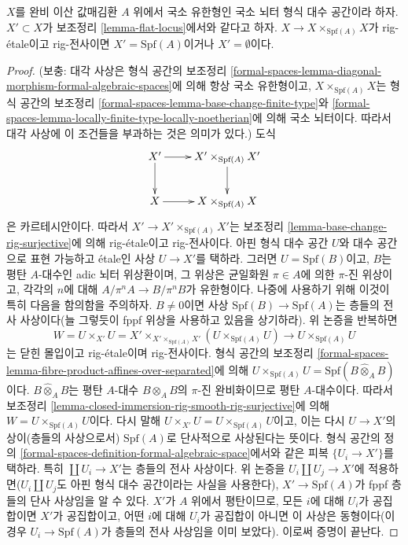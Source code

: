 \begin{lemma}
\label{lemma-flat-and-diagonal-rig-surjective}
$X$를 완비 이산 값매김환 $A$ 위에서 국소 유한형인 국소 뇌터 형식 대수
공간이라 하자. $X' \subset X$가 보조정리 \ref{lemma-flat-locus}에서와 같다고
하자. $X \to X \times_{\text{Spf}(A)} X$가 rig-\'etale이고 rig-전사이면
$X' = \text{Spf}(A)$이거나 $X' = \emptyset$이다.
\end{lemma}

\begin{proof}
(보충: 대각 사상은 형식 공간의 보조정리
\ref{formal-spaces-lemma-diagonal-morphism-formal-algebraic-spaces}에 의해 항상
국소 유한형이고, $X \times_{\text{Spf}(A)} X$는 형식 공간의 보조정리
\ref{formal-spaces-lemma-base-change-finite-type}와
\ref{formal-spaces-lemma-locally-finite-type-locally-noetherian}에 의해
국소 뇌터이다. 따라서 대각 사상에 이 조건들을 부과하는 것은 의미가 있다.)
도식
$$
\xymatrix{
X' \ar[r] \ar[d] & X' \times_{\text{Spf}(A)} X' \ar[d] \\
X \ar[r] & X \times_{\text{Spf}(A)} X
}
$$
은 카르테시안이다. 따라서
$X' \to X' \times_{\text{Spf}(A)} X'$는
보조정리 \ref{lemma-base-change-rig-surjective}에 의해 rig-\'etale이고
rig-전사이다. 아핀 형식 대수 공간 $U$와 대수 공간으로 표현 가능하고
\'etale인 사상 $U \to X'$를 택하라. 그러면 $U = \text{Spf}(B)$이고,
$B$는 평탄 $A$-대수인 adic 뇌터 위상환이며, 그 위상은 균일화원
$\pi \in A$에 의한 $\pi$-진 위상이고, 각각의 $n$에 대해
$A/\pi^n A \to B/\pi^n B$가 유한형이다. 나중에 사용하기 위해 이것이
특히 다음을 함의함을 주의하자. $B \not = 0$이면 사상
$\text{Spf}(B) \to \text{Spf}(A)$는 층들의 전사 사상이다(늘 그렇듯이
fppf 위상을 사용하고 있음을 상기하라). 위 논증을 반복하면
$$
W = U \times_{X'} U =
X' \times_{X' \times_{\text{Spf}(A)} X'} (U \times_{\text{Spf}(A)} U)
\longrightarrow
U \times_{\text{Spf}(A)} U
$$
는 닫힌 몰입이고 rig-\'etale이며 rig-전사이다. 형식 공간의 보조정리
\ref{formal-spaces-lemma-fibre-product-affines-over-separated}에 의해
$U \times_{\text{Spf}(A)} U = \text{Spf}(B \widehat{\otimes}_A B)$이다.
$B \widehat{\otimes}_A B$는 평탄 $A$-대수 $B \otimes_A B$의
$\pi$-진 완비화이므로 평탄 $A$-대수이다. 따라서 보조정리
\ref{lemma-closed-immersion-rig-smooth-rig-surjective}에 의해
$W = U \times_{\text{Spf}(A)} U$이다. 다시 말해
$U \times_{X'} U = U \times_{\text{Spf}(A)} U$이고, 이는 다시
$U \to X'$의 상이(층들의 사상으로서) $\text{Spf}(A)$로 단사적으로
사상된다는 뜻이다. 형식 공간의 정의
\ref{formal-spaces-definition-formal-algebraic-space}에서와 같은 피복
$\{U_i \to X'\}$를 택하라. 특히 $\coprod U_i \to X'$는 층들의 전사
사상이다. 위 논증을
$U_i \coprod U_j \to X'$에 적용하면($U_i \amalg U_j$도 아핀 형식 대수
공간이라는 사실을 사용한다), $X' \to \text{Spf}(A)$가 fppf 층들의 단사
사상임을 알 수 있다. $X'$가 $A$ 위에서 평탄이므로, 모든 $i$에 대해
$U_i$가 공집합이면 $X'$가 공집합이고, 어떤 $i$에 대해 $U_i$가 공집합이
아니면 이 사상은 동형이다(이 경우 $U_i \to \text{Spf}(A)$가 층들의 전사
사상임을 이미 보았다). 이로써 증명이 끝난다.
\end{proof}

